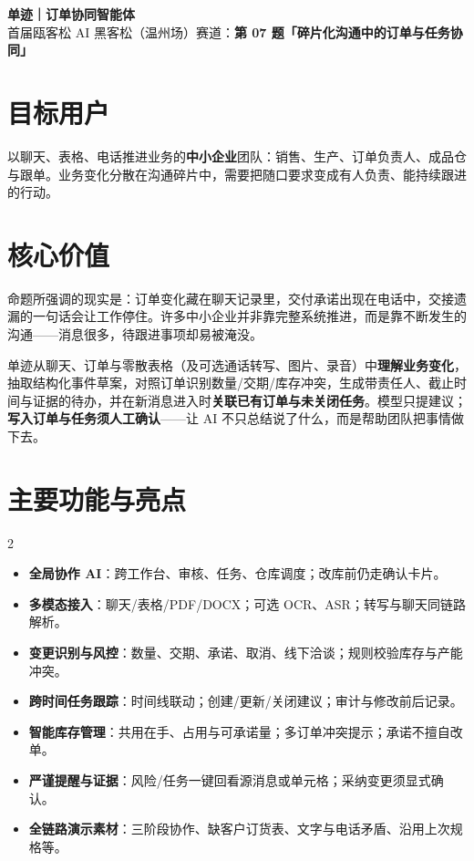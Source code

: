 \documentclass[a4paper]{ctexart}
\begin{document}
\begin{center}
  {\Large\bfseries\color{accent} 单迹｜订单协同智能体}\\[0.15em]
  {\footnotesize 首届瓯客松 AI 黑客松（温州场）\;\textbar\;赛道：\textbf{第 07 题「碎片化沟通中的订单与任务协同」}}
\end{center}

\section*{目标用户}
以聊天、表格、电话推进业务的\textbf{中小企业}团队：销售、生产、订单负责人、成品仓与跟单。业务变化分散在沟通碎片中，需要把随口要求变成有人负责、能持续跟进的行动。

\section*{核心价值}
命题所强调的现实是：订单变化藏在聊天记录里，交付承诺出现在电话中，交接遗漏的一句话会让工作停住。许多中小企业并非靠完整系统推进，而是靠不断发生的沟通——消息很多，待跟进事项却易被淹没。

单迹从聊天、订单与零散表格（及可选通话转写、图片、录音）中\textbf{理解业务变化}，抽取结构化事件草案，对照订单识别数量/交期/库存冲突，生成带责任人、截止时间与证据的待办，并在新消息进入时\textbf{关联已有订单与未关闭任务}。模型只提建议；\textbf{写入订单与任务须人工确认}——让 AI 不只总结说了什么，而是帮助团队把事情做下去。

\section*{主要功能与亮点}
\begin{multicols}{2}
\begin{itemize}[leftmargin=1em,itemsep=0.08em,topsep=0.15em]
  \item \textbf{全局协作 AI}：跨工作台、审核、任务、仓库调度；改库前仍走确认卡片。
  \item \textbf{多模态接入}：聊天/表格/PDF/DOCX；可选 OCR、ASR；转写与聊天同链路解析。
  \item \textbf{变更识别与风控}：数量、交期、承诺、取消、线下洽谈；规则校验库存与产能冲突。
  \item \textbf{跨时间任务跟踪}：时间线联动；创建/更新/关闭建议；审计与修改前后记录。
  \item \textbf{智能库存管理}：共用在手、占用与可承诺量；多订单冲突提示；承诺不擅自改单。
  \item \textbf{严谨提醒与证据}：风险/任务一键回看源消息或单元格；采纳变更须显式确认。
  \item \textbf{全链路演示素材}：三阶段协作、缺客户订货表、文字与电话矛盾、沿用上次规格等。
\end{itemize}
\end{multicols}
\end{document}
